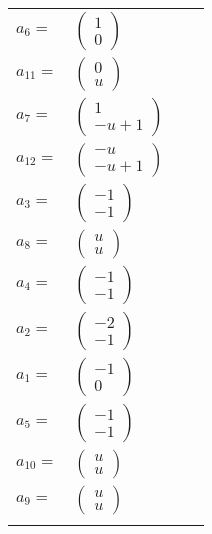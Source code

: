 \documentclass[1p]{elsarticle_modified}
\theoremstyle{definition}
\begin{document}
\begin{tabular}{m{7pt} m{180pt} m{7pt} m{180pt} }
\flushright $a_{6}=$&$\begin{pmatrix}1\\0\end{pmatrix}$ \\
\flushright $a_{11}=$&$\begin{pmatrix}0\\u\end{pmatrix}$ \\
\flushright $a_{7}=$&$\begin{pmatrix}1\\- u+1\end{pmatrix}$ \\
\flushright $a_{12}=$&$\begin{pmatrix}- u\\- u+1\end{pmatrix}$ \\
\flushright $a_{3}=$&$\begin{pmatrix}-1\\-1\end{pmatrix}$ \\
\flushright $a_{8}=$&$\begin{pmatrix}u\\u\end{pmatrix}$ \\
\flushright $a_{4}=$&$\begin{pmatrix}-1\\-1\end{pmatrix}$ \\
\flushright $a_{2}=$&$\begin{pmatrix}-2\\-1\end{pmatrix}$ \\
\flushright $a_{1}=$&$\begin{pmatrix}-1\\0\end{pmatrix}$ \\
\flushright $a_{5}=$&$\begin{pmatrix}-1\\-1\end{pmatrix}$ \\
\flushright $a_{10}=$&$\begin{pmatrix}u\\u\end{pmatrix}$ \\
\flushright $a_{9}=$&$\begin{pmatrix}u\\u\end{pmatrix}$\\&\end{tabular}
\end{document}
